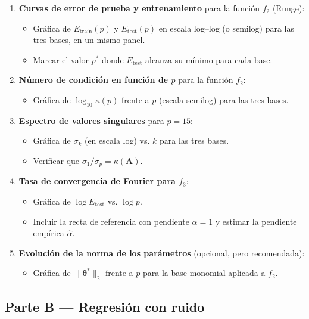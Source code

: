 \begin{enumerate}[leftmargin=2em, label=\textbf{G\arabic*.}]
  \item \textbf{Curvas de error de prueba y entrenamiento} para la función \(f_2\) (Runge):
    \begin{itemize}
      \item Gráfica de \(E_{\mathrm{train}}(p)\) y \(E_{\mathrm{test}}(p)\) en escala log–log (o semilog) para las tres bases, en un mismo panel.
      \item Marcar el valor \(p^*\) donde \(E_{\mathrm{test}}\) alcanza su mínimo para cada base.
    \end{itemize}
  \item \textbf{Número de condición en función de \(p\)} para la función \(f_2\):
    \begin{itemize}
      \item Gráfica de \(\log_{10}\kappa(p)\) frente a \(p\) (escala semilog) para las tres bases.
    \end{itemize}
  \item \textbf{Espectro de valores singulares} para \(p = 15\):
    \begin{itemize}
      \item Gráfica de \(\sigma_k\) (en escala log) vs. \(k\) para las tres bases.
      \item Verificar que \(\sigma_1/\sigma_p = \kappa(\mathbf{A})\).
    \end{itemize}
  \item \textbf{Tasa de convergencia de Fourier para \(f_3\)}:
    \begin{itemize}
      \item Gráfica de \(\log E_{\mathrm{test}}\) vs. \(\log p\).
      \item Incluir la recta de referencia con pendiente \(\alpha = 1\) y estimar la pendiente empírica \(\hat{\alpha}\).
    \end{itemize}
  \item \textbf{Evolución de la norma de los parámetros} (opcional, pero recomendada):
    \begin{itemize}
      \item Gráfica de \(\|\boldsymbol{\theta}^*\|_2\) frente a \(p\) para la base monomial aplicada a \(f_2\).
    \end{itemize}
\end{enumerate}

\subsection*{Parte B — Regresión con ruido}

